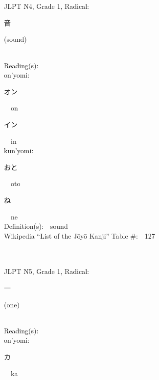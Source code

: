 \begin{multicols}{2}
\ \ \\
{\fontsize{34pt}{40pt}  }\ \ \\  %
{JLPT N4, Grade 1, Radical:\ \ {\begin{CJK}{UTF8}{min} 音 \end{CJK}} (sound) } \\
Reading(s):\ \ \\
{\hspace*{1em}}on'yomi:\ \ \\
{\hspace*{2em}}{\begin{CJK}{UTF8}{min} オン \end{CJK}}\ \ on\ \ \\
{\hspace*{2em}}{\begin{CJK}{UTF8}{min} イン \end{CJK}}\ \ in\ \ \\
{\hspace*{1em}}kun'yomi:\ \ \\
{\hspace*{2em}}{\begin{CJK}{UTF8}{min} おと \end{CJK}}\ \ oto\ \ \\
{\hspace*{2em}}{\begin{CJK}{UTF8}{min} ね \end{CJK}}\ \ ne\ \ \\
Definition(s):\ \ sound \\
Wikipedia ``List of the J\=oy\=o Kanji'' Table \#:\ \ 127 \\
\ \ \\
{\fontsize{34pt}{40pt}  }\ \ \\  %
{JLPT N5, Grade 1, Radical:\ \ {\begin{CJK}{UTF8}{min} 一 \end{CJK}} (one) } \\
Reading(s):\ \ \\
{\hspace*{1em}}on'yomi:\ \ \\
{\hspace*{2em}}{\begin{CJK}{UTF8}{min} カ \end{CJK}}\ \ ka\ \ \\

\end{multicols}

